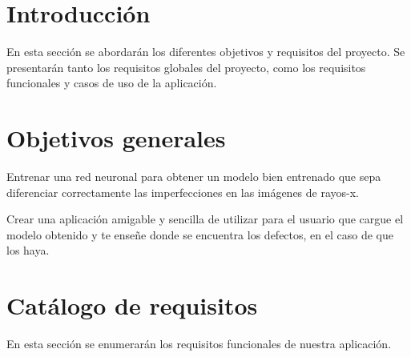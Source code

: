 
\section{Introducción}

En esta sección se abordarán los diferentes objetivos y requisitos del proyecto. Se presentarán tanto los requisitos globales del proyecto, como los requisitos funcionales y casos de uso de la aplicación.


\section{Objetivos generales}

Entrenar una red neuronal para obtener un modelo bien entrenado que sepa diferenciar correctamente las imperfecciones en las imágenes de rayos-x.
 
Crear una aplicación amigable y sencilla de utilizar para el usuario que cargue el modelo obtenido y te enseñe donde se encuentra los defectos, en el caso de que los haya.

\section{Catálogo de requisitos}

En esta sección se enumerarán los requisitos funcionales de nuestra aplicación.

